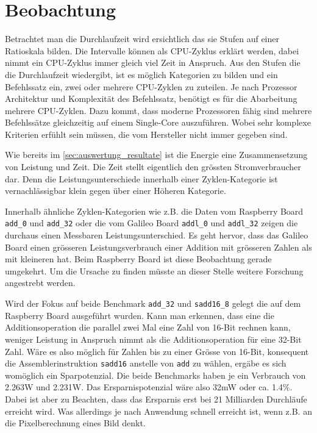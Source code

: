 





\section{Beobachtung}

Betrachtet man die Durchlaufzeit wird ersichtlich das sie Stufen auf einer Ratioskala bilden. Die Intervalle können als CPU-Zyklus erklärt werden, dabei nimmt ein CPU-Zyklus immer gleich viel Zeit in Anspruch. Aus den Stufen die die Durchlaufzeit wiedergibt, ist es möglich Kategorien zu bilden und ein Befehlssatz ein, zwei oder mehrere CPU-Zyklen zu zuteilen. Je nach Prozessor Architektur und Komplexität des Befehlssatz, benötigt es für die Abarbeitung mehrere CPU-Zyklen. Dazu kommt, dass moderne Prozessoren fähig sind mehrere Befehlssätze gleichzeitig auf einem Single-Core auszuführen. Wobei sehr komplexe Kriterien erfühlt sein müssen, die vom Hersteller nicht immer gegeben sind.
\par
Wie bereits im \autoref{sec:auswertung_resultate} ist die Energie eine Zusammensetzung von Leistung und Zeit. Die Zeit stellt eigentlich den grössten Stromverbraucher dar. Denn die Leistungsunterschiede innerhalb einer Zyklen-Kategorie ist vernachlässigbar klein gegen über einer Höheren Kategorie.
\par
Innerhalb ähnliche Zyklen-Kategorien wie z.B. die Daten vom Raspberry Board \texttt{add\_0} und \texttt{add\_32} oder die vom Galileo Board \texttt{addl\_0} und \texttt{addl\_32} zeigen die durchaus einen Messbaren Leistungsunterschied. Es geht hervor, dass das Galileo Board einen grösseren Leistungsverbrauch einer Addition mit grösseren Zahlen als mit kleineren hat. Beim Raspberry Board ist diese Beobachtung gerade umgekehrt. Um die Ursache zu finden müsste an dieser Stelle weitere Forschung angestrebt werden.
\par
Wird der Fokus auf beide Benchmark \texttt{add\_32} und \texttt{sadd16\_8} gelegt die auf dem Raspberry Board ausgeführt wurden. Kann man erkennen,  dass eine die Additionsoperation die parallel zwei Mal eine Zahl von 16-Bit rechnen kann, weniger Leistung in Anspruch nimmt als die Additionsoperation für eine 32-Bit Zahl. Wäre es also möglich für Zahlen bis zu einer Grösse von 16-Bit, konsequent die Assemblerinstruktion \texttt{sadd16} anstelle von \texttt{add} zu wählen, ergäbe es sich womöglich ein Sparpotenzial. Die beide Benchmarks haben je ein Verbrauch von 2.263W und 2.231W. Das Ersparnispotenzial wäre also 32mW oder ca. 1.4\%. Dabei ist aber zu Beachten, dass das Ersparnis erst bei 21 Milliarden Durchläufe erreicht wird. Was allerdings je nach Anwendung schnell erreicht ist, wenn z.B. an die Pixelberechnung eines Bild denkt.
\par















